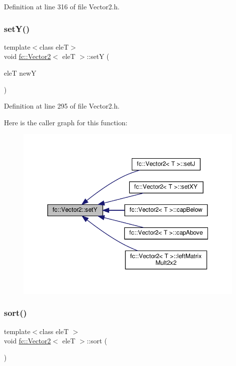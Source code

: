 Definition at line 316 of file Vector2.\+h.

\mbox{\label{classfc_1_1Vector2_a7244e0666c79cc618f917210f723ed98}} 
\subsubsection{\texorpdfstring{set\+Y()}{setY()}}
{\footnotesize\ttfamily template$<$class eleT$>$ \\
void \hyperlink{classfc_1_1Vector2}{fc\+::\+Vector2}$<$ eleT $>$\+::setY (\begin{DoxyParamCaption}\item[{eleT}]{newY }\end{DoxyParamCaption})}



Definition at line 295 of file Vector2.\+h.

Here is the caller graph for this function\+:
\nopagebreak
\begin{figure}[H]
\begin{center}
\leavevmode
\includegraphics[width=345pt]{d9/d08/classfc_1_1Vector2_a7244e0666c79cc618f917210f723ed98_icgraph}
\end{center}
\end{figure}
\mbox{\label{classfc_1_1Vector2_a493e8fb804b1943a4878afb4191f8fb6}} 
\subsubsection{\texorpdfstring{sort()}{sort()}}
{\footnotesize\ttfamily template$<$class eleT $>$ \\
void \hyperlink{classfc_1_1Vector2}{fc\+::\+Vector2}$<$ eleT $>$\+::sort (\begin{DoxyParamCaption}{ }\end{DoxyParamCaption})}



